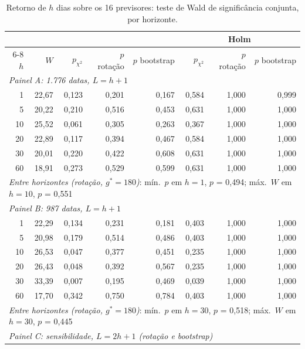 \begin{table}[H]
\centering
\footnotesize
\caption{Retorno de $h$ dias sobre os 16 previsores: teste de Wald de significância conjunta, por horizonte.}
\label{tab:retlin-wald-direto}
\begin{tabular}{rrrrrrrr}
\toprule
 & & & & & \multicolumn{3}{c}{Holm} \\ \cmidrule(lr){6-8}
$h$ & $W$ & $p_{\chi^2}$ & $p$ rotação & $p$ bootstrap & $p_{\chi^2}$ & $p$ rotação & $p$ bootstrap \\
\midrule
\multicolumn{8}{l}{\textit{Painel A: 1.776 datas, $L = h+1$}} \\
1 & 22{,}67 & 0{,}123 & 0{,}201 & 0{,}167 & 0{,}584 & 1{,}000 & 0{,}999 \\
5 & 20{,}22 & 0{,}210 & 0{,}516 & 0{,}453 & 0{,}631 & 1{,}000 & 1{,}000 \\
10 & 25{,}52 & 0{,}061 & 0{,}305 & 0{,}263 & 0{,}367 & 1{,}000 & 1{,}000 \\
20 & 22{,}89 & 0{,}117 & 0{,}394 & 0{,}467 & 0{,}584 & 1{,}000 & 1{,}000 \\
30 & 20{,}01 & 0{,}220 & 0{,}422 & 0{,}608 & 0{,}631 & 1{,}000 & 1{,}000 \\
60 & 18{,}91 & 0{,}273 & 0{,}529 & 0{,}599 & 0{,}631 & 1{,}000 & 1{,}000 \\
\multicolumn{8}{l}{\textit{Entre horizontes (rotação, $g^* = 180$)}: mín.\ $p$ em $h = 1$, $p$ = 0{,}494; máx.\ $W$ em $h = 10$, $p$ = 0{,}551} \\
\midrule
\multicolumn{8}{l}{\textit{Painel B: 987 datas, $L = h+1$}} \\
1 & 22{,}29 & 0{,}134 & 0{,}231 & 0{,}181 & 0{,}403 & 1{,}000 & 1{,}000 \\
5 & 20{,}98 & 0{,}179 & 0{,}514 & 0{,}486 & 0{,}403 & 1{,}000 & 1{,}000 \\
10 & 26{,}53 & 0{,}047 & 0{,}377 & 0{,}451 & 0{,}235 & 1{,}000 & 1{,}000 \\
20 & 26{,}43 & 0{,}048 & 0{,}392 & 0{,}567 & 0{,}235 & 1{,}000 & 1{,}000 \\
30 & 33{,}39 & 0{,}007 & 0{,}195 & 0{,}469 & 0{,}039 & 1{,}000 & 1{,}000 \\
60 & 17{,}70 & 0{,}342 & 0{,}750 & 0{,}784 & 0{,}403 & 1{,}000 & 1{,}000 \\
\multicolumn{8}{l}{\textit{Entre horizontes (rotação, $g^* = 180$)}: mín.\ $p$ em $h = 30$, $p$ = 0{,}518; máx.\ $W$ em $h = 30$, $p$ = 0{,}445} \\
\midrule
\multicolumn{8}{l}{\textit{Painel C: sensibilidade, $L = 2h+1$ (rotação e bootstrap)}} \\

\end{tabular}
\end{table}
